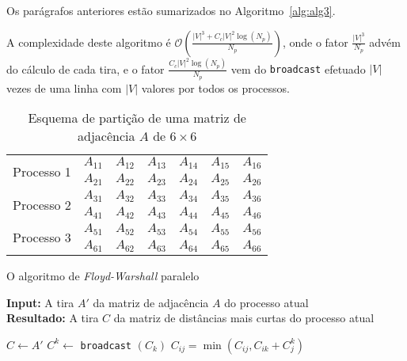 \documentclass[10pt,a4paper,oneside]{article}
\newcommand{\BigO}[1]{\mathcal{O}(#1)}
\begin{document}
Os parágrafos anteriores estão sumarizados no Algoritmo~\ref{alg:alg3}.

A complexidade deste algoritmo é $\BigO{\frac{|V|^3 + C_c |V|^2
    \log{(N_p)}}{N_p}}$, onde o fator $\frac{|V|^3}{N_p}$ advém do
cálculo de cada tira, e o fator $\frac{C_c |V|^2 \log{(N_p)}}{N_p}$ vem
do {\tt broadcast} efetuado $|V|$ vezes de uma linha com $|V|$ valores
por todos os processos.

\begin{table}[t]
  \centering
  \caption{Esquema de partição de uma matriz de adjacência $A$ de $6 \times 6$}
  \label{tbl:tbl2}
  \begin{tabular}{|c|c|c|c|c|c|c|}
    \hline
    \multirow{2}{*}{Processo 1} & $A_{11}$ & $A_{12}$ & $A_{13}$ & $A_{14}$ & $A_{15}$ & $A_{16}$ \\ \cline{2-7}
    & $A_{21}$ & $A_{22}$ & $A_{23}$ & $A_{24}$ & $A_{25}$ & $A_{26}$ \\ \hline \hline
    \multirow{2}{*}{Processo 2} & $A_{31}$ & $A_{32}$ & $A_{33}$ & $A_{34}$ & $A_{35}$ & $A_{36}$ \\ \cline{2-7}
    & $A_{41}$ & $A_{42}$ & $A_{43}$ & $A_{44}$ & $A_{45}$ & $A_{46}$ \\ \hline \hline
    \multirow{2}{*}{Processo 3} & $A_{51}$ & $A_{52}$ & $A_{53}$ & $A_{54}$ & $A_{55}$ & $A_{56}$ \\ \cline{2-7}
    & $A_{61}$ & $A_{62}$ & $A_{63}$ & $A_{64}$ & $A_{65}$ & $A_{66}$ \\ \hline
  \end{tabular}
\end{table}

\begin{algorithm}[b]
\small
\caption{O algoritmo de \textit{Floyd-Warshall} paralelo}
\renewcommand{\arraystretch}{0.85}
\textbf{Input:} A tira $A'$ da matriz de adjacência $A$ do processo atual\\
\textbf{Resultado:} A tira $C$ da matriz de distâncias mais curtas do processo atual\\
\renewcommand{\arraystretch}{1.0}
\label{alg:alg3}
\begin{algorithmic}[1]
\State $C \leftarrow A'$
 \State $C^k \leftarrow $ {\tt broadcast} $(C_k)$
      \State $C_{ij} = \min{(C_{ij}, C_{ik} + C^k_{j})}$
    \EndFor
  \EndFor
\EndFor
\end{algorithmic}
\end{algorithm}

\end{document}
